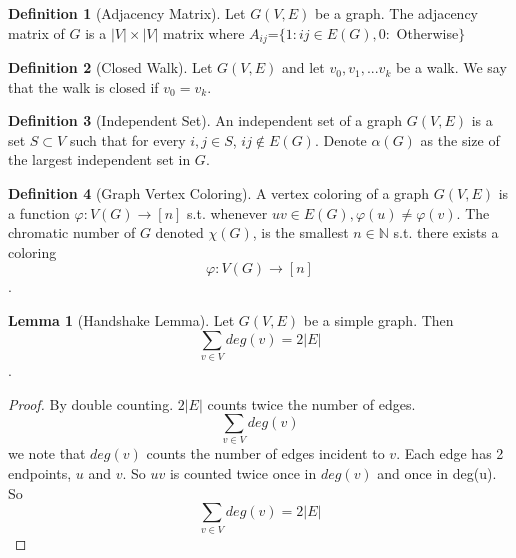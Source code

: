 \documentclass{article}
\theoremstyle{definition}
\newtheorem{define}{Definition}[section]
\newtheorem{lem}{Lemma}[section]
\begin{document}
\begin{define}[Adjacency Matrix]
Let $G(V,E)$ be a graph. The adjacency matrix of $G$ is a $|V| \times |V|$ matrix where $A_{ij}$=$\{1:ij\in E(G), 0:$ Otherwise$\}$
\end{define}

\begin{define}[Closed Walk]
Let $G(V, E)$ and let $v_0, v_1,...v_k$ be a walk. We say that the walk is closed if $v_0 = v_k$.
\end{define}

\begin{define}[Independent Set]
An independent set of a graph $G(V,E)$ is a set $S \subset V$ such that for every $i,j \in S$, $ij \notin E(G)$. Denote $\alpha(G)$ as the size of the largest independent set in $G$.
\end{define}

\begin{define}[Graph Vertex Coloring] 
A vertex coloring of a graph $G(V, E)$ is a function $\varphi : V(G) \rightarrow [n]$ s.t. whenever $uv\in E(G), \varphi(u) \neq \varphi(v)$. The chromatic number of $G$ denoted $\chi(G)$, is the smallest $n \in \mathbb{N}$ s.t. there exists a coloring $$\varphi:V(G)\rightarrow [n]$$. 
\end{define}

\begin{lem}[Handshake Lemma]
Let $G(V, E)$ be a simple graph. Then $$\sum_{v\in V}deg(v) = 2|E|$$.
\end{lem}
\begin{proof} 
By double counting. $2|E|$ counts twice the number of edges. $$\sum_{v\in V}deg(v)$$we note that $deg(v)$ counts the number of edges incident to $v$. Each edge has 2 endpoints, $u$ and $v$. So $uv$ is counted twice once in $deg(v)$ and once in deg(u). So  $$\sum_{v\in V}deg(v) = 2|E|$$
\end{proof}
\end{document}
